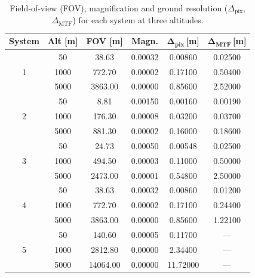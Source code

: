 \begin{table}[h]
    \centering
    \footnotesize
    \setlength{\tabcolsep}{6pt}
    \caption{Field‑of‑view (FOV), magnification and ground resolution 
             (\(\Delta_\text{pix}\), \(\Delta_\text{MTF}\)) for each system
             at three altitudes.}
    \label{tab:grd_fov_clean}
    \begin{tabular}{|c|c|c|c|c|c|}
        \hline
        \rowcolor[HTML]{EFEFEF}
        \textbf{System} & \textbf{Alt [m]} & \textbf{FOV [m]} & 
        \textbf{Magn.} & \(\boldsymbol{\Delta_\text{pix}}\)\,[m] & 
        \(\boldsymbol{\Delta_\text{MTF}}\)\,[m] \\ 
        \hline
        
        \multirow{3}{*}{1} 
         & 50   & 38.63  & 0.00032   & 0.00860  & 0.02500   \\ 
         & 1000 & 772.70 & 0.00002   & 0.17100  & 0.50400   \\ 
         & 5000 & 3863.00& 0.00000   & 0.85600  & 2.52000   \\ 
        \hline
        
        \multirow{3}{*}{2}
         & 50   & 8.81   & 0.00150   & 0.00160  & 0.00190  \\ 
         & 1000 & 176.30 & 0.00008   & 0.03200  & 0.03700   \\ 
         & 5000 & 881.30 & 0.00002   & 0.16000  & 0.18600   \\ 
        \hline
        
        \multirow{3}{*}{3}
         & 50   & 24.73  & 0.00050   & 0.00548  & 0.02500   \\ 
         & 1000 & 494.50 & 0.00003   & 0.11000  & 0.50000   \\ 
         & 5000 & 2473.00& 0.00001   & 0.54800  & 2.50000   \\ 
        \hline
        
        \multirow{3}{*}{4}
         & 50   & 38.63  & 0.00032   & 0.00860  & 0.01200   \\ 
         & 1000 & 772.70 & 0.00002   & 0.17100  & 0.24400   \\ 
         & 5000 & 3863.00& 0.00000   & 0.85600  & 1.22100   \\ 
        \hline
        
        \multirow{3}{*}{5}
         & 50   & 140.60 & 0.00005   & 0.11700  & —         \\ 
         & 1000 & 2812.80& 0.00000   & 2.34400  & —         \\ 
         & 5000 & 14064.00&0.00000   & 11.72000 & —         \\ 
        \hline
        

\end{tabular}
\end{table}
